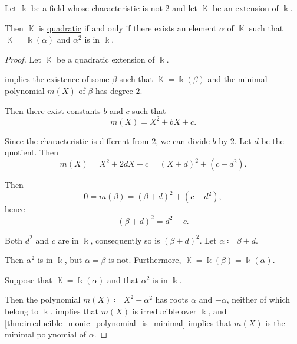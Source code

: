 \begin{proposition}\label{thm:quadratic_extension_square_root}
  Let \( \Bbbk \) be a field whose \hyperref[def:ring_characteristic]{characteristic} is not \( 2 \) and let \( \BbbK \) be an extension of \( \Bbbk \).

  Then \( \BbbK \) is \hyperref[def:field_extension_degree]{quadratic} if and only if there exists an element \( \alpha \) of \( \BbbK \) such that \( \BbbK = \Bbbk(\alpha) \) and \( \alpha^2 \) is in \( \Bbbk \).
\end{proposition}
\begin{proof}
  \SufficiencySubProof Let \( \BbbK \) be a quadratic extension of \( \Bbbk \).

   implies the existence of some \( \beta \) such that \( \BbbK = \Bbbk(\beta) \) and the minimal polynomial \( m(X) \) of \( \beta \) has degree \( 2 \).

  Then there exist constants \( b \) and \( c \) such that
  \begin{equation*}
    m(X) = X^2 + bX + c.
  \end{equation*}

  Since the characteristic is different from \( 2 \), we can divide \( b \) by \( 2 \). Let \( d \) be the quotient. Then
  \begin{equation*}
    m(X) = X^2 + 2dX + c = (X + d)^2 + (c - d^2).
  \end{equation*}

  Then
  \begin{equation*}
    0 = m(\beta) = (\beta + d)^2 + (c - d^2),
  \end{equation*}
  hence
  \begin{equation*}
    (\beta + d)^2 = d^2 - c.
  \end{equation*}

  Both \( d^2 \) and \( c \) are in \( \Bbbk \), consequently so is \( (\beta + d)^2 \). Let \( \alpha \coloneqq \beta + d \).

  Then \( \alpha^2 \) is in \( \Bbbk \), but \( \alpha = \beta \) is not. Furthermore, \( \BbbK = \Bbbk(\beta) = \Bbbk(\alpha) \).

  \NecessitySubProof Suppose that \( \BbbK = \Bbbk(\alpha) \) and that \( \alpha^2 \) is in \( \Bbbk \).

  Then the polynomial \( m(X) \coloneqq X^2 - \alpha^2 \) has roots \( \alpha \) and \( -\alpha \), neither of which belong to \( \Bbbk \).  implies that \( m(X) \) is irreducible over \( \Bbbk \), and \cref{thm:irreducible_monic_polynomial_is_minimal} implies that \( m(X) \) is the minimal polynomial of \( \alpha \).
\end{proof}

